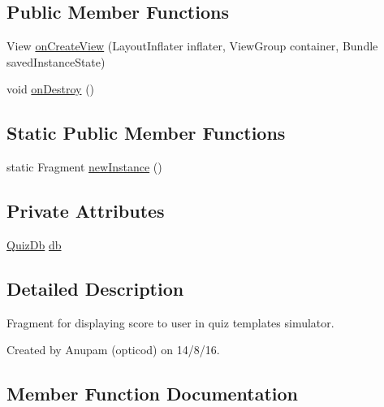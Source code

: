 \subsection*{Public Member Functions}
\begin{DoxyCompactItemize}
\item 
View \hyperlink{classorg_1_1buildmlearn_1_1toolkit_1_1quiztemplate_1_1fragment_1_1LastFragment_a6a0236a0ccf656b9a51c3040663710f3}{on\+Create\+View} (Layout\+Inflater inflater, View\+Group container, Bundle saved\+Instance\+State)
\item 
void \hyperlink{classorg_1_1buildmlearn_1_1toolkit_1_1quiztemplate_1_1fragment_1_1LastFragment_ac0728416a01c2e1c65cef0f30d9e264a}{on\+Destroy} ()
\end{DoxyCompactItemize}
\subsection*{Static Public Member Functions}
\begin{DoxyCompactItemize}
\item 
static Fragment \hyperlink{classorg_1_1buildmlearn_1_1toolkit_1_1quiztemplate_1_1fragment_1_1LastFragment_adc3465988bfa4092e433b0bd88061026}{new\+Instance} ()
\end{DoxyCompactItemize}
\subsection*{Private Attributes}
\begin{DoxyCompactItemize}
\item 
\hyperlink{classorg_1_1buildmlearn_1_1toolkit_1_1quiztemplate_1_1data_1_1QuizDb}{Quiz\+Db} \hyperlink{classorg_1_1buildmlearn_1_1toolkit_1_1quiztemplate_1_1fragment_1_1LastFragment_a7922fafd27dd29463273c01b8e74f337}{db}
\end{DoxyCompactItemize}


\subsection{Detailed Description}
Fragment for displaying score to user in quiz template\textquotesingle{}s simulator. 

Created by Anupam (opticod) on 14/8/16. 

\subsection{Member Function Documentation}
